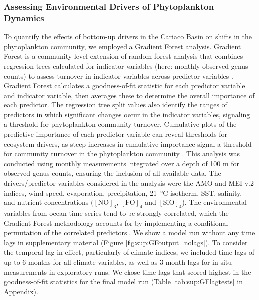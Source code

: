 \documentclass[draft]{agujournal2019}
\begin{document}
    \subsubsection{Assessing Environmental Drivers of Phytoplankton Dynamics}
    To quantify the effects of bottom-up drivers in the Cariaco Basin on shifts in the phytoplankton community, we employed a Gradient Forest analysis. Gradient Forest is a community-level extension of random forest analysis that combines regression trees calculated for indicator variables (here: monthly observed genus counts) to assess turnover in indicator variables across predictor variables \cite{pitcher_example_2012, large_critical_2015, tam_comparing_2017}. Gradient Forest calculates a goodness-of-fit statistic for each predictor variable and indicator variable, then averages these to determine the overall importance of each predictor. The regression tree split values also identify the ranges of predictors in which significant changes occur in the indicator variables, signaling a threshold for phytoplankton community turnover. Cumulative plots of the predictive importance of each predictor variable can reveal thresholds for ecosystem drivers, as steep increases in cumulative importance signal a threshold for community turnover in the phytoplankton community \cite{tam_comparing_2017}. This analysis was conducted using monthly measurements integrated over a depth of 100 m for observed genus counts, ensuring the inclusion of all available data. The drivers/predictor variables considered in the analysis were the AMO and MEI v.2 indices, wind speed, evaporation, precipitation, \qty{21}{\celsius} isotherm, SST, salinity, and nutrient concentrations ($\mathrm{[NO]}_3$, $\mathrm{[PO]}_4$ and $\mathrm{[SiO]}_4$). 
    The environmental variables from ocean time series tend to be strongly correlated, which the Gradient Forest methodology accounts for by implementing a conditional permutation of the correlated predictors \cite{ellis_gradient_2012}. 
    We show a model run without any time lags in  supplementary material (Figure \ref{fig:sup:GFoutput_nolags}). To consider the temporal lag in effect, particularly of climate indices, we included time lags of up to 6 months for all climate variables, as well as 3-month lags for in-situ measurements in exploratory runs. We chose time lags that scored highest in the goodness-of-fit statistics for the final model run (Table \ref{tab:sup:GFlagtests} in Appendix). 
\end{document}
